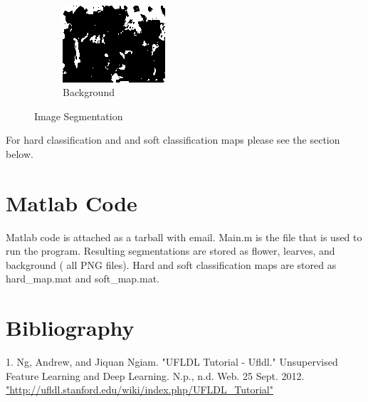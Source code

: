 \documentclass[a4paper, 12pt]{article}
\begin{document}
\begin{figure}[H]
\begin{subfigure}[b]{0.3\textwidth}
        \end{subfigure}
        ~ %
        \begin{subfigure}[b]{0.3\textwidth}
                \centering
                \includegraphics[width=\textwidth]{bckgrnd}
                \caption{Background}
                \label{fig:mouse}
        \end{subfigure}
        \caption{Image Segmentation}\label{fig:animals}
\end{figure}

For hard classification and and soft classification maps please see the section below.

\section{Matlab Code}

Matlab code is attached as a tarball with email. Main.m is the file that is used to run the program. Resulting segmentations  are stored as flower, learves, and background ( all PNG files). Hard and soft classification maps are stored as hard\_map.mat and soft\_map.mat.

\section*{Bibliography}
%



1. Ng, Andrew, and Jiquan Ngiam. "UFLDL Tutorial - Ufldl." Unsupervised Feature Learning and Deep Learning. N.p., n.d. Web. 25 Sept. 2012. \url{"http://ufldl.stanford.edu/wiki/index.php/UFLDL\_Tutorial"}
\end{document}
